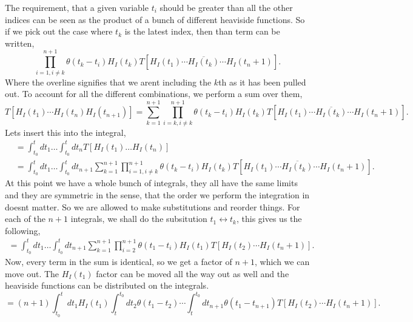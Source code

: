 \documentclass[working, oneside]{../../Preambles/tuftebook}
\begin{document}
The requirement, that a given variable $t_i$ should be greater than all the other indices can be seen as the product of a bunch of different heaviside functions. So if we pick out the case where $t_k$ is the latest index, then than term can be written,
\[
\prod^{n+1}_{i=1, i \neq k}\theta \left(t_k - t_i  \right) H_I\left( t_k \right) T\left[ H_I\left( t_1 \right) \cdots \overline{H_I\left( t_k \right) }\cdots H_I\left( t_n+1 \right)  \right]  
.\] 
Where the overline signifies that we arent including the $k$th as it has been pulled out. To account for all the different combinations, we perform a sum over them,
 \[
    T\left[ H_{I}\left( t_1 \right) \cdots H_{I}\left( t_n \right) H_{I}\left( t_{n+1} \right)  \right] = \sum^{n+1}_{k = 1}\prod^{n+1}_{i=k, i \neq k}\theta \left(t_k - t_i  \right) H_I\left( t_k \right) T\left[ H_I\left( t_1 \right) \cdots \overline{H_I\left( t_k \right) }\cdots H_I\left( t_n+1 \right)  \right]  
.\] 
Lets insert this into the integral,
\begin{align*}
&=\int_{t_0}^t dt_1 \dots \int_{t_0}^t dt_n T[H_I(t_1) \dots H_I(t_n)] \\
&=\int_{t_0}^t dt_1 \dots \int_{t_0}^t dt_{n+1}\sum^{n+1}_{k = 1}\prod^{n+1}_{i=1, i \neq k}\theta \left(t_k - t_i  \right) H_I\left( t_k \right) T\left[ H_I\left( t_1 \right) \cdots \overline{H_I\left( t_k \right) }\cdots H_I\left( t_n+1 \right)  \right]  
.\end{align*}
At this point we have a whole bunch of integrals, they all have the same limits and they are symmetric in the sense, that the order we perform the integration in doesnt matter. So we are allowed to make substitutions and reorder things. For each of the $n+1$ integrals, we shall do the subsitution $t_1 \leftrightarrow t_k$, this gives us the following,
\begin{align*}
=\int_{t_0}^t dt_1 \dots \int_{t_0}^t dt_{n+1}\sum^{n+1}_{k = 1}\prod^{n+1}_{i=2}\theta \left(t_1 - t_i  \right) H_I\left( t_1 \right) T\left[ H_I\left( t_2 \right) \cdots H_I\left( t_n+1 \right)  \right]  
.\end{align*}
Now, every term in the sum is identical, so we get a factor of $n+1$, which we can move out. The $H_I\left( t_1 \right) $ factor can be moved all the way out as well and the heaviside functions can be distributed on the integrals.
\[
= \left( n+1 \right) \int^{t}_{t_0} dt_1H_{I}\left( t_1 \right)  \int_{t}^{t_0} dt_2 \theta \left( t_1 - t_2 \right) \cdots \int_{t}^{t_0} dt_{n+1}\theta \left( t_1 - t_{n+1} \right) T\left[ H_I\left( t_2 \right) \cdots H_I\left( t_n+1 \right)  \right]  
.\] 
\end{document}
